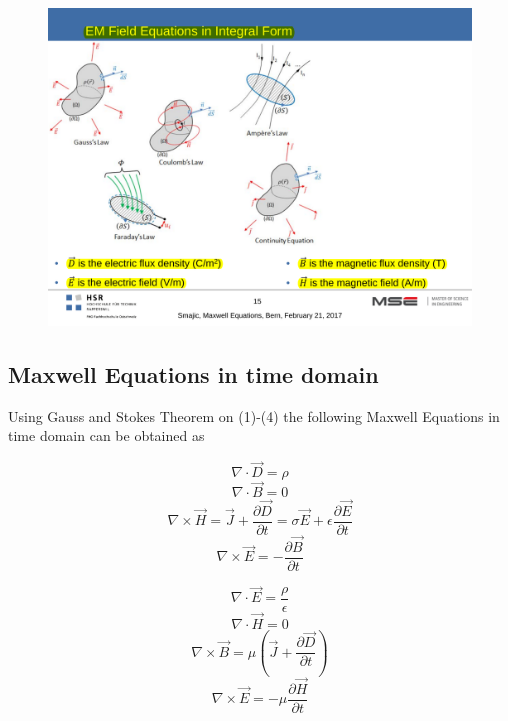 \begin{figure}[h!]
	\centering
	\includegraphics[width=.7\textwidth]{./images/MaxwellEqImages.pdf}
\end{figure}

\subsection{Maxwell Equations in time domain}
Using Gauss and Stokes Theorem on (1)-(4) the following Maxwell Equations in time domain can be obtained as 

\begin{multicols}{2}
	\begin{equation*}
		\nabla \cdot \vec{D} = \rho
	\end{equation*}
	\begin{equation*}
		\nabla \cdot \vec{B} = 0
	\end{equation*}
	\begin{equation*}
		\nabla \times \vec{H} = \vec{J} + \frac{\partial \vec{D}}{\partial t} = \sigma \vec{E} + \epsilon \frac{\partial \vec{E}}{\partial t}
	\end{equation*}
	\begin{equation*}
		\nabla \times \vec{E} = - \frac{\partial \vec{B}}{\partial t}
	\end{equation*}
	
	\begin{equation*}
		\nabla \cdot \vec{E} = \frac{\rho}{\epsilon}
	\end{equation*}
	\begin{equation*}
		\nabla \cdot \vec{H} = 0
	\end{equation*}
	\begin{equation*}
		\nabla \times \vec{B} = \mu\left(\vec{J} + \frac{\partial \vec{D}}{\partial t}\right)
	\end{equation*}
	\begin{equation*}
		\nabla \times \vec{E} = -\mu \frac{\partial \vec{H}}{\partial t}
	\end{equation*}
\end{multicols}

